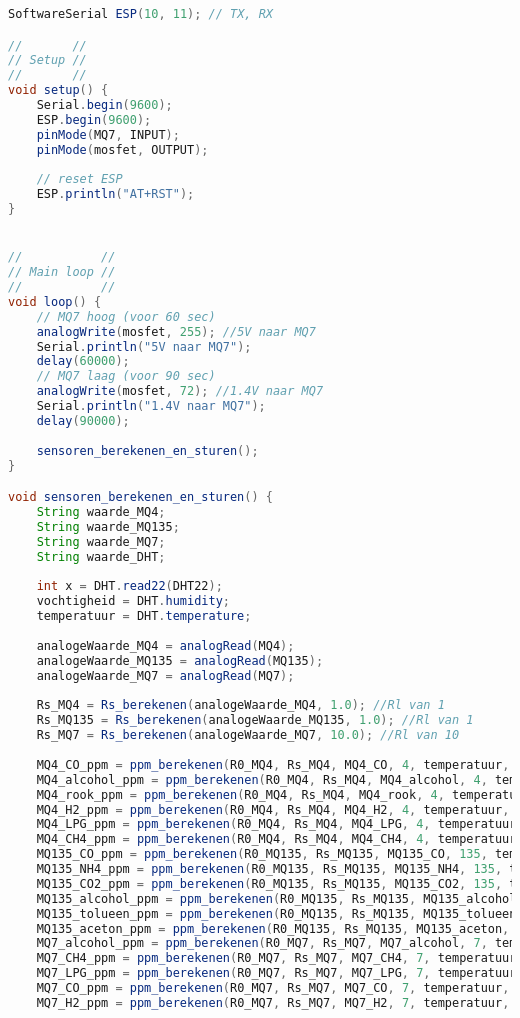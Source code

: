\begin{lstlisting}[language=Java,caption={MQ sensoren naar de databank}]
SoftwareSerial ESP(10, 11); // TX, RX

//       //
// Setup //
//       //
void setup() {
    Serial.begin(9600);
    ESP.begin(9600);
    pinMode(MQ7, INPUT);
    pinMode(mosfet, OUTPUT);
    
    // reset ESP
    ESP.println("AT+RST");
}


//           //
// Main loop //
//           //
void loop() {
    // MQ7 hoog (voor 60 sec)
    analogWrite(mosfet, 255); //5V naar MQ7
    Serial.println("5V naar MQ7");
    delay(60000);
    // MQ7 laag (voor 90 sec)
    analogWrite(mosfet, 72); //1.4V naar MQ7
    Serial.println("1.4V naar MQ7");
    delay(90000);
    
    sensoren_berekenen_en_sturen();
}

void sensoren_berekenen_en_sturen() {
    String waarde_MQ4;
    String waarde_MQ135;
    String waarde_MQ7;
    String waarde_DHT;
    
    int x = DHT.read22(DHT22);
    vochtigheid = DHT.humidity;
    temperatuur = DHT.temperature;
    
    analogeWaarde_MQ4 = analogRead(MQ4);
    analogeWaarde_MQ135 = analogRead(MQ135);
    analogeWaarde_MQ7 = analogRead(MQ7);
    
    Rs_MQ4 = Rs_berekenen(analogeWaarde_MQ4, 1.0); //Rl van 1
    Rs_MQ135 = Rs_berekenen(analogeWaarde_MQ135, 1.0); //Rl van 1
    Rs_MQ7 = Rs_berekenen(analogeWaarde_MQ7, 10.0); //Rl van 10
    
    MQ4_CO_ppm = ppm_berekenen(R0_MQ4, Rs_MQ4, MQ4_CO, 4, temperatuur, vochtigheid);
    MQ4_alcohol_ppm = ppm_berekenen(R0_MQ4, Rs_MQ4, MQ4_alcohol, 4, temperatuur, vochtigheid);
    MQ4_rook_ppm = ppm_berekenen(R0_MQ4, Rs_MQ4, MQ4_rook, 4, temperatuur, vochtigheid);
    MQ4_H2_ppm = ppm_berekenen(R0_MQ4, Rs_MQ4, MQ4_H2, 4, temperatuur, vochtigheid);
    MQ4_LPG_ppm = ppm_berekenen(R0_MQ4, Rs_MQ4, MQ4_LPG, 4, temperatuur, vochtigheid);
    MQ4_CH4_ppm = ppm_berekenen(R0_MQ4, Rs_MQ4, MQ4_CH4, 4, temperatuur, vochtigheid);
    MQ135_CO_ppm = ppm_berekenen(R0_MQ135, Rs_MQ135, MQ135_CO, 135, temperatuur, vochtigheid);
    MQ135_NH4_ppm = ppm_berekenen(R0_MQ135, Rs_MQ135, MQ135_NH4, 135, temperatuur, vochtigheidv);
    MQ135_CO2_ppm = ppm_berekenen(R0_MQ135, Rs_MQ135, MQ135_CO2, 135, temperatuur, vochtigheid);
    MQ135_alcohol_ppm = ppm_berekenen(R0_MQ135, Rs_MQ135, MQ135_alcohol, 135, temperatuur, vochtigheid);
    MQ135_tolueen_ppm = ppm_berekenen(R0_MQ135, Rs_MQ135, MQ135_tolueen, 135, temperatuur, vochtigheid);
    MQ135_aceton_ppm = ppm_berekenen(R0_MQ135, Rs_MQ135, MQ135_aceton, 135, temperatuur, vochtigheid);
    MQ7_alcohol_ppm = ppm_berekenen(R0_MQ7, Rs_MQ7, MQ7_alcohol, 7, temperatuur, vochtigheid);
    MQ7_CH4_ppm = ppm_berekenen(R0_MQ7, Rs_MQ7, MQ7_CH4, 7, temperatuur, vochtigheid);
    MQ7_LPG_ppm = ppm_berekenen(R0_MQ7, Rs_MQ7, MQ7_LPG, 7, temperatuur, vochtigheid);
    MQ7_CO_ppm = ppm_berekenen(R0_MQ7, Rs_MQ7, MQ7_CO, 7, temperatuur, vochtigheid);
    MQ7_H2_ppm = ppm_berekenen(R0_MQ7, Rs_MQ7, MQ7_H2, 7, temperatuur, vochtigheid);
    

\end{lstlisting}

